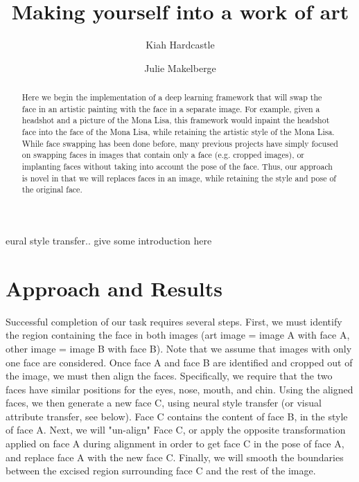 \documentclass{pnastwo2}
\begin{document}
\title{Making yourself into a work of art}

\author{Kiah Hardcastle
\and Julie Makelberge}


\maketitle

\begin{article}

\begin{abstract}

Here we begin the implementation of a deep learning framework that will swap the face in an artistic painting with the face in a separate image. For example, given a headshot and a picture of the Mona Lisa, this framework would inpaint the headshot face into the face of the Mona Lisa, while retaining the artistic style of the Mona Lisa. While face swapping has been done before, many previous projects have simply focused on swapping faces in images that contain only a face (e.g. cropped images), or implanting faces without taking into account the pose of the face. Thus, our approach is novel in that we will replaces faces in an image, while retaining the style and pose of the original face.

\end{abstract}

eural style transfer.. give some introduction here

\section{Approach and Results}

Successful completion of our task requires several steps. First, we must identify the region containing the face in both images (art image = image A with face A, other image = image B with face B). Note that we assume that images with only one face are considered. Once face A and face B are identified and cropped out of the image, we must then align the faces. Specifically, we require that the two faces have similar positions for the eyes, nose, mouth, and chin. Using the aligned faces, we then generate a new face C, using neural style transfer (or visual attribute transfer, see below). Face C contains the content of face B, in the style of face A. Next, we will "un-align" Face C, or apply the opposite transformation applied on face A during alignment in order to get face C in the pose of face A, and replace face A with the new face C. Finally, we will smooth the boundaries between the excised region surrounding face C and the rest of the image. 


\end{article}
\end{document}
